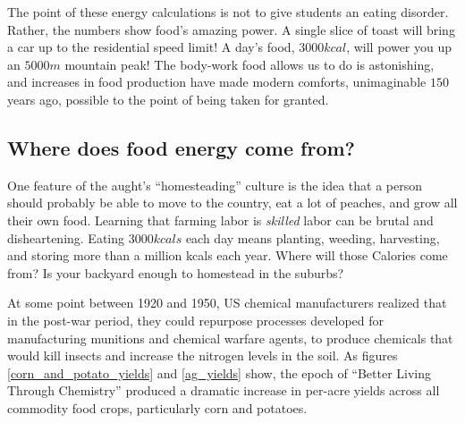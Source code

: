 \documentclass[prb,preprint]{revtex4-2}
\begin{document}
The point of these energy calculations is not to give students an eating disorder.  Rather, the numbers show food's amazing power. A single slice of toast will bring a car up to the residential speed limit!  A day's food, $3000kcal$, will power you up an $5000m$ mountain peak! The body-work food allows us to do is astonishing, and increases in food production have made modern  comforts, unimaginable $150$ years ago, possible to the point of being taken for granted.  

\clearpage

\subsection{Where does food energy come from?}
One feature of the aught's ``homesteading'' culture\cite{homesteading} is the idea that a person should probably be able to move to the country, eat a lot of peaches, and grow all their own food.  Learning that farming labor is \textit{skilled} labor can be brutal and disheartening. Eating $3000kcals$ each day means planting, weeding, harvesting, and storing more than a million kcals each year.\cite{Haspel}  
Where will those Calories come from? Is your backyard enough to homestead in the suburbs?\cite{backyard_homestead}

At some point between 1920 and 1950, US chemical manufacturers realized that in the post-war period, they could repurpose processes developed for manufacturing munitions and chemical warfare agents, to produce chemicals that would kill insects and increase the nitrogen levels in the soil. 
As figures \ref{corn_and_potato_yields} and \ref{ag_yields} show, the epoch of ``Better Living Through Chemistry'' produced a dramatic increase in per-acre yields across all commodity food crops, particularly corn and potatoes.  
\end{document}
